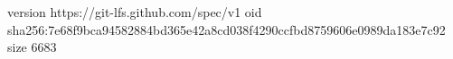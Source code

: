 version https://git-lfs.github.com/spec/v1
oid sha256:7e68f9bca94582884bd365e42a8cd038f4290ccfbd8759606e0989da183e7c92
size 6683
